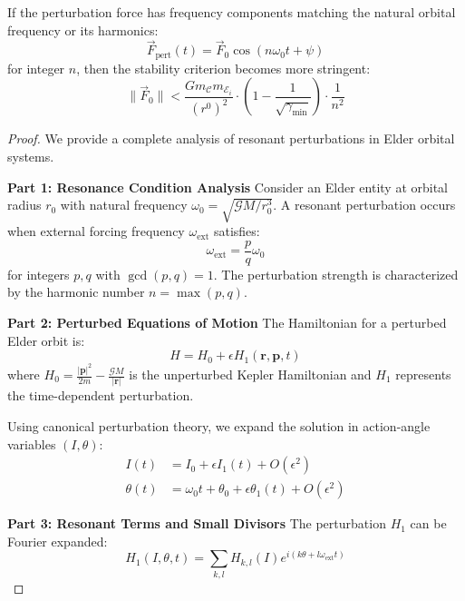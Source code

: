 \begin{corollary}
If the perturbation force has frequency components matching the natural orbital frequency or its harmonics:
\begin{equation}
\vec{F}_{\text{pert}}(t) = \vec{F}_0 \cos(n\omega_0 t + \psi)
\end{equation}
for integer $n$, then the stability criterion becomes more stringent:
\begin{equation}
\|\vec{F}_0\| < \frac{G m_{\mathcal{C}} m_{\mathcal{E}_i}}{(r^0)^2} \cdot \left(1 - \frac{1}{\sqrt{\gamma_{\text{min}}}}\right) \cdot \frac{1}{n^2}
\end{equation}
\end{corollary}

\begin{proof}
We provide a complete analysis of resonant perturbations in Elder orbital systems.

\textbf{Part 1: Resonance Condition Analysis}
Consider an Elder entity at orbital radius $r_0$ with natural frequency $\omega_0 = \sqrt{\mathcal{G}M/r_0^3}$. A resonant perturbation occurs when external forcing frequency $\omega_{\text{ext}}$ satisfies:
\begin{equation}
\omega_{\text{ext}} = \frac{p}{q} \omega_0
\end{equation}
for integers $p, q$ with $\gcd(p,q) = 1$. The perturbation strength is characterized by the harmonic number $n = \max(p,q)$.

\textbf{Part 2: Perturbed Equations of Motion}
The Hamiltonian for a perturbed Elder orbit is:
\begin{equation}
H = H_0 + \epsilon H_1(\mathbf{r}, \mathbf{p}, t)
\end{equation}
where $H_0 = \frac{|\mathbf{p}|^2}{2m} - \frac{\mathcal{G}M}{|\mathbf{r}|}$ is the unperturbed Kepler Hamiltonian and $H_1$ represents the time-dependent perturbation.

Using canonical perturbation theory, we expand the solution in action-angle variables $(I, \theta)$:
\begin{align}
I(t) &= I_0 + \epsilon I_1(t) + O(\epsilon^2) \\
\theta(t) &= \omega_0 t + \theta_0 + \epsilon \theta_1(t) + O(\epsilon^2)
\end{align}

\textbf{Part 3: Resonant Terms and Small Divisors}
The perturbation $H_1$ can be Fourier expanded:
\begin{equation}
H_1(I, \theta, t) = \sum_{k,l} H_{k,l}(I) e^{i(k\theta + l\omega_{\text{ext}}t)}
\end{equation}


\end{proof}
